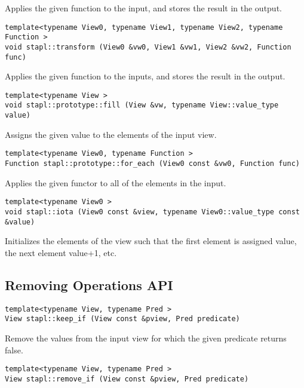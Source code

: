 Applies the given function to the input, and stores the result in the output.

\begin{verbatim}
template<typename View0, typename View1, typename View2, typename Function >
void stapl::transform (View0 &vw0, View1 &vw1, View2 &vw2, Function func)
\end{verbatim}

Applies the given function to the inputs, and stores the result in the output.

\begin{verbatim}
template<typename View >
void stapl::prototype::fill (View &vw, typename View::value_type value)
\end{verbatim}

Assigns the given value to the elements of the input view.

\begin{verbatim}
template<typename View0, typename Function >
Function stapl::prototype::for_each (View0 const &vw0, Function func)
\end{verbatim}

Applies the given functor to all of the elements in the input.

\begin{verbatim}
template<typename View0 >
void stapl::iota (View0 const &view, typename View0::value_type const &value)
\end{verbatim}

Initializes the elements of the view such that the first element is assigned value, the next element value+1, etc.


\subsection{Removing Operations API} \label{sec-remove-alg}

\begin{verbatim}
template<typename View, typename Pred >
View stapl::keep_if (View const &pview, Pred predicate)
\end{verbatim}

Remove the values from the input view for which the given predicate returns false.

\begin{verbatim}
template<typename View, typename Pred >
View stapl::remove_if (View const &pview, Pred predicate)
\end{verbatim}

